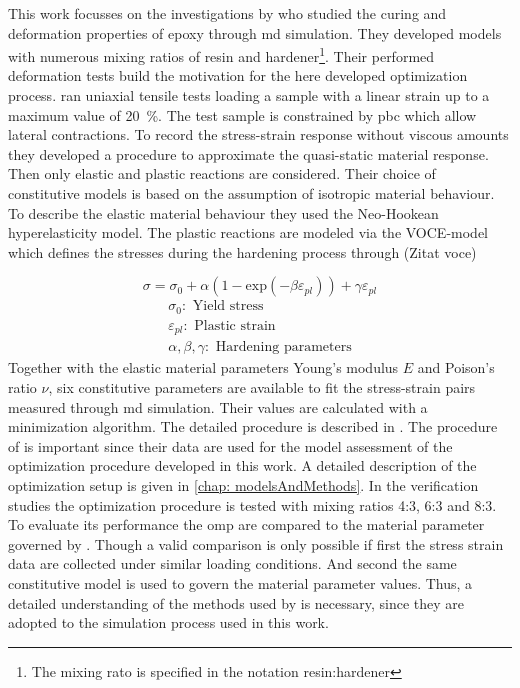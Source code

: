 This work focusses on the investigations by \citet{ries_deciphering_nodate} who studied the curing and deformation properties of epoxy through \acrshort{md} simulation. They developed models with numerous mixing ratios of resin and hardener\footnote{The mixing rato is specified in the notation resin:hardener}. Their performed deformation tests build the motivation for the here developed optimization process. \citet{ries_deciphering_nodate} ran uniaxial tensile tests loading a sample with a linear strain up to a maximum value of 20 \%. The test sample is constrained by \acrshort{pbc} which allow lateral contractions. To record the stress-strain response without viscous amounts they developed a procedure to approximate the quasi-static material response. Then only elastic and plastic reactions are considered. Their choice of constitutive models is based on the assumption of isotropic material behaviour. To describe the elastic material behaviour they used the Neo-Hookean hyperelasticity model. The plastic reactions are modeled via the VOCE-model which defines the stresses during the hardening process through (Zitat voce)

\begin{equation}
    \sigma = \sigma_0 + \alpha(1 - \text{exp}(-\beta \varepsilon_{pl})) + \gamma \varepsilon_{pl}
\end{equation}
\begin{gather*}
    \sigma_0: \text{ Yield stress} \\
    \varepsilon_{pl}: \text{ Plastic strain} \\
    \alpha, \beta,  \gamma: \text{ Hardening parameters}
\end{gather*}
Together with the elastic material parameters Young's modulus $E$ and Poison's ratio $\nu$, six constitutive parameters are available to fit the stress-strain pairs measured through \acrshort{md} simulation. Their values are calculated with a minimization algorithm. The detailed procedure is described in \cite{ries_deciphering_nodate}. The procedure of \citet{ries_deciphering_nodate} is important since their data are used for the model assessment of the optimization procedure developed in this work. A detailed description of the optimization setup is given in \autoref{chap: modelsAndMethods}. In the verification studies the optimization procedure is tested with mixing ratios 4:3, 6:3 and 8:3. To evaluate its performance the \acrlong{omp} are compared to the material parameter governed by \citet{ries_deciphering_nodate}. Though a valid comparison is only possible if first the stress strain data are collected under similar loading conditions. And second the same constitutive model is used to govern the material parameter values. Thus, a detailed understanding of the methods used by \citet{ries_deciphering_nodate} is necessary, since they are adopted to the simulation process used in this work.  




